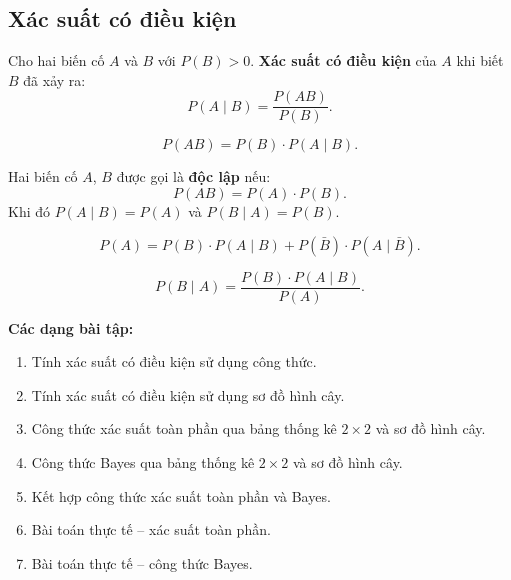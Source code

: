\documentclass[12pt,a4paper]{article}
\begin{document}
\subsection{Xác suất có điều kiện}

\begin{dinhnghia}
  Cho hai biến cố $A$ và $B$ với $P(B) > 0$. \textbf{Xác suất có điều kiện} của $A$ khi biết $B$ đã xảy ra:
  \[
    P(A \mid B) = \dfrac{P(AB)}{P(B)}.
  \]
\end{dinhnghia}

\begin{congthuc}[title={Công thức nhân}]
  \[
    P(AB) = P(B) \cdot P(A \mid B).
  \]
\end{congthuc}

\begin{dinhnghia}[title={Biến cố độc lập}]
  Hai biến cố $A$, $B$ được gọi là \textbf{độc lập} nếu:
  \[
    P(AB) = P(A) \cdot P(B).
  \]
  Khi đó $P(A \mid B) = P(A)$ và $P(B \mid A) = P(B)$.
\end{dinhnghia}

\begin{congthuc}[title={Xác suất toàn phần}]
  \[
    P(A) = P(B) \cdot P(A \mid B) + P(\bar{B}) \cdot P(A \mid \bar{B}).
  \]
\end{congthuc}

\begin{congthuc}[title={Công thức Bayes}]
  \[
    P(B \mid A) = \dfrac{P(B) \cdot P(A \mid B)}{P(A)}.
  \]
\end{congthuc}

\medskip\noindent\textbf{Các dạng bài tập:}
\begin{enumerate}[label=\textbf{Dạng \arabic*:}, leftmargin=*, align=left]
  \item Tính xác suất có điều kiện sử dụng công thức.
  \item Tính xác suất có điều kiện sử dụng sơ đồ hình cây.
  \item Công thức xác suất toàn phần qua bảng thống kê $2 \times 2$ và sơ đồ hình cây.
  \item Công thức Bayes qua bảng thống kê $2 \times 2$ và sơ đồ hình cây.
  \item Kết hợp công thức xác suất toàn phần và Bayes.
  \item Bài toán thực tế -- xác suất toàn phần.
  \item Bài toán thực tế -- công thức Bayes.
\end{enumerate}
\end{document}
